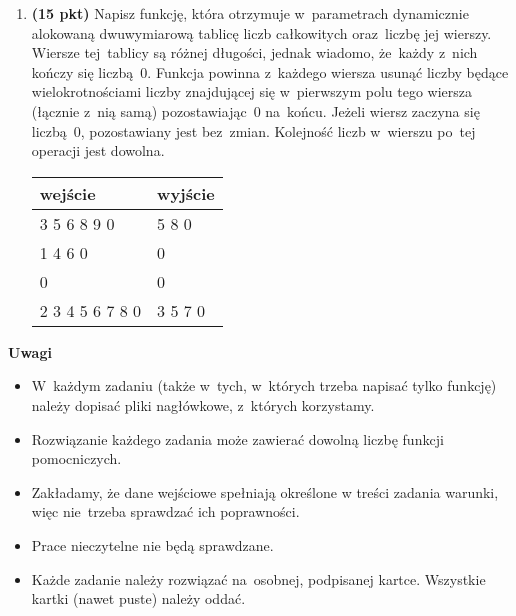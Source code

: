 \documentclass[extrafontsizes,10pt]{article}
\begin{document}
\begin{enumerate}
\item \textbf{(15 pkt)}
Napisz funkcję, która otrzymuje w~parametrach
dynamicznie alokowaną dwuwymiarową tablicę
liczb całkowitych oraz~liczbę jej wierszy.
Wiersze tej~tablicy są różnej długości,
jednak wiadomo, że~każdy z~nich kończy się liczbą~0.
Funkcja powinna z~każdego wiersza usunąć liczby
będące wielokrotnościami liczby znajdującej się
w~pierwszym polu tego wiersza (łącznie z~nią samą)
pozostawiając~0 na~końcu.
Jeżeli wiersz zaczyna się liczbą~0,
pozostawiany jest bez~zmian.
Kolejność liczb w~wierszu
po~tej operacji jest dowolna.
\begin{center}
\begin{tabular}{ l l }
wejście & wyjście \\
\hline
3 5 6 8 9 0 & 5 8 0 \\
1 4 6 0 & 0 \\
0 & 0 \\
2 3 4 5 6 7 8 0 & 3 5 7 0
\end{tabular}
\end{center}


\end{enumerate}

\vfill

\textbf{Uwagi}

\begin{itemize}
\item W~każdym zadaniu (także w~tych, w~których trzeba napisać tylko funkcję) należy dopisać pliki nagłówkowe, z~których korzystamy.
\item Rozwiązanie każdego zadania może zawierać dowolną liczbę funkcji pomocniczych.
\item Zakładamy, że dane wejściowe spełniają określone w treści zadania warunki, więc nie~trzeba sprawdzać ich poprawności.
\item Prace nieczytelne nie będą sprawdzane.
\item Każde zadanie należy rozwiązać na~osobnej, podpisanej kartce. Wszystkie kartki (nawet puste) należy oddać.
\end{itemize}
\end{document}
